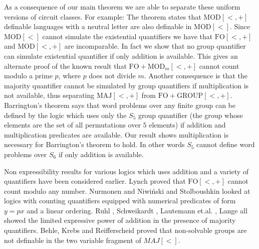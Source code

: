 \documentclass[envcountsame]{llncs}
\newcommand{\FO}{\mathrm{FO}}
\newcommand{\GROUP}{\mathrm{GROUP}}
\newcommand{\MOD}{\mathrm{MOD}}
\newcommand{\MAJ}{\mathrm{MAJ}}
\begin{document}
As a consequence of our main theorem we are able to separate these uniform versions of circuit classes.
For example: The theorem states that $\MOD[<,+]$ definable languages with a neutral letter are also definable in $\MOD[<]$. Since $\MOD[<]$ cannot simulate the existential quantifiers \cite{str_cirBook} we have that $\FO[<,+]$ and $\MOD[<,+]$ are incomparable. In fact we show that no group quantifier can simulate existential quantifier if only addition is available.
This gives an alternate proof of the known result \cite{roy_defGenFO} that $\FO+\MOD_m[<,+]$ cannot count modulo a
prime $p$, where $p$ does not divide $m$. 
Another consequence is that the majority quantifier cannot be simulated by group quantifiers if multiplication is not available, thus
separating $\MAJ[<,+]$ from $\FO+\GROUP[<,+]$. Barrington's theorem \cite{barr_NC1} says that word problems over any finite group can be defined by the logic which 
uses only the $S_5$ group quantifier (the group whose elements are the set of all permutations over $5$ elements) if addition and multiplication predicates are available.
Our result shows multiplication is necessary for Barrington's theorem to hold. In other words $S_5$ cannot define word problems over
$S_6$ if only addition is available. 

Non expressibility results for various logics which uses addition and a variety of quantifiers have been considered earlier. Lynch \cite{lynch82} proved that $\FO[<,+]$ cannot count modulo any number. Nurmonen \cite{nur_countQuant} and Niwi\'nski and Stolboushkin \cite{niw_yEq2x} looked at logics with counting quantifiers equipped with numerical predicates of form $y=px$ and a linear ordering. Ruhl \cite{ruhl_FOUnc}, Schweikardt \cite{schwei_FOUnc},
Lautemann et.al. \cite{lautemann_logcfl}, Lange \cite{lange_majQnt} all showed the limited expressive power of addition in the presence of majority quantifiers. Behle, Krebs and Reifferscheid \cite{behle_regLangMajQnt,behle_nonSolvGrpsNotinMaj} proved that non-solvable groups are not definable in the two variable fragment of $MAJ[<]$. 
\end{document}
